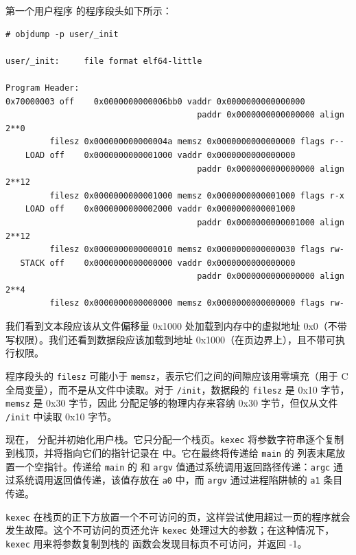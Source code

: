 第一个用户程序  的程序段头如下所示：
\begin{footnotesize}
\begin{verbatim}
# objdump -p user/_init

user/_init:     file format elf64-little

Program Header:
0x70000003 off    0x0000000000006bb0 vaddr 0x0000000000000000
                                       paddr 0x0000000000000000 align 2**0
         filesz 0x000000000000004a memsz 0x0000000000000000 flags r--
    LOAD off    0x0000000000001000 vaddr 0x0000000000000000
                                       paddr 0x0000000000000000 align 2**12
         filesz 0x0000000000001000 memsz 0x0000000000001000 flags r-x
    LOAD off    0x0000000000002000 vaddr 0x0000000000001000
                                       paddr 0x0000000000001000 align 2**12
         filesz 0x0000000000000010 memsz 0x0000000000000030 flags rw-
   STACK off    0x0000000000000000 vaddr 0x0000000000000000
                                       paddr 0x0000000000000000 align 2**4
         filesz 0x0000000000000000 memsz 0x0000000000000000 flags rw-
\end{verbatim}
\end{footnotesize}

我们看到文本段应该从文件偏移量 0x1000 处加载到内存中的虚拟地址 0x0（不带写权限）。我们还看到数据段应该加载到地址 0x1000（在页边界上），且不带可执行权限。

程序段头的 \lstinline{filesz} 可能小于 \lstinline{memsz}，表示它们之间的间隙应该用零填充（用于 C 全局变量），而不是从文件中读取。对于 \lstinline{/init}，数据段的 \lstinline{filesz} 是 0x10 字节，\lstinline{memsz} 是 0x30 字节，因此  分配足够的物理内存来容纳 0x30 字节，但仅从文件 \lstinline{/init} 中读取 0x10 字节。

现在， 分配并初始化用户栈。它只分配一个栈页。\lstinline{kexec} 将参数字符串逐个复制到栈顶，并将指向它们的指针记录在  中。它在最终将传递给 \lstinline{main} 的  列表末尾放置一个空指针。传递给 \lstinline{main} 的  和 \lstinline{argv} 值通过系统调用返回路径传递：\lstinline{argc} 通过系统调用返回值传递，该值存放在 {\tt a0} 中，而 \lstinline{argv} 通过进程陷阱帧的 {\tt a1} 条目传递。

\lstinline{kexec} 在栈页的正下方放置一个不可访问的页，这样尝试使用超过一页的程序就会发生故障。这个不可访问的页还允许 \lstinline{kexec} 处理过大的参数；在这种情况下，\lstinline{kexec} 用来将参数复制到栈的   函数会发现目标页不可访问，并返回 -1。

